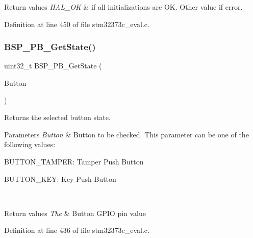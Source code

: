 \begin{DoxyRetVals}{Return values}
{\em H\+A\+L\+\_\+\+OK} & if all initializations are OK. Other value if error. \\
\hline
\end{DoxyRetVals}


Definition at line 450 of file stm32373c\+\_\+eval.\+c.

\mbox{\label{group___private___functions_ga8f0978b6cffda9c67266ddfdb3a0abf7}} 
\subsubsection{B\+S\+P\+\_\+\+P\+B\+\_\+\+Get\+State()}
{\footnotesize\ttfamily uint32\+\_\+t B\+S\+P\+\_\+\+P\+B\+\_\+\+Get\+State (\begin{DoxyParamCaption}\item[{\textbf{ Button\+\_\+\+Type\+Def}}]{Button }\end{DoxyParamCaption})}



Returns the selected button state. 


\begin{DoxyParams}{Parameters}
{\em Button} & Button to be checked. This parameter can be one of the following values\+: \begin{DoxyItemize}
\item B\+U\+T\+T\+O\+N\+\_\+\+T\+A\+M\+P\+ER\+: Tamper Push Button \item B\+U\+T\+T\+O\+N\+\_\+\+K\+EY\+: Key Push Button \end{DoxyItemize}
\\
\hline
\end{DoxyParams}

\begin{DoxyRetVals}{Return values}
{\em The} & Button G\+P\+IO pin value \\
\hline
\end{DoxyRetVals}


Definition at line 436 of file stm32373c\+\_\+eval.\+c.

\mbox{\label{group___private___functions_gaeece1cd3a2156a50bfa81638a27a1143}} 
